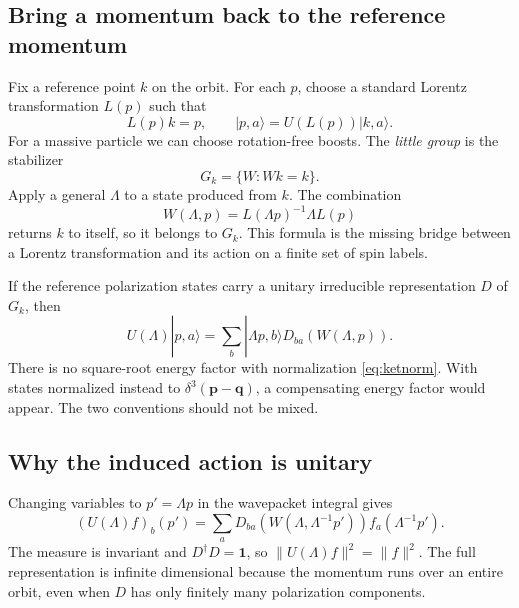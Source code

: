 \documentclass[11pt]{article}
\newcommand{\one}{\mathbf 1}
\begin{document}
\subsection{Bring a momentum back to the reference momentum}
Fix a reference point \(k\) on the orbit. For each \(p\), choose a
standard Lorentz transformation \(L(p)\) such that
\begin{equation}
 L(p)k=p,\qquad |p,a\rangle=U(L(p))|k,a\rangle.
 \label{eq:standardboost}
\end{equation}
For a massive particle we can choose rotation-free boosts. The
\emph{little group} is the stabilizer
\begin{equation}
 G_k=\{W:Wk=k\}.
 \label{eq:littledef}
\end{equation}
Apply a general \(\Lambda\) to a state produced from \(k\). The
combination
\begin{equation}
 \boxed{W(\Lambda,p)=L(\Lambda p)^{-1}\Lambda L(p)}
 \label{eq:wigner}
\end{equation}
returns \(k\) to itself, so it belongs to \(G_k\). This formula is
the missing bridge between a Lorentz transformation and its action
on a finite set of spin labels.

If the reference polarization states carry a unitary irreducible
representation \(D\) of \(G_k\), then
\begin{equation}
 \boxed{U(\Lambda)|p,a\rangle
   =\sum_b|\Lambda p,b\rangle
        D_{ba}\!\left(W(\Lambda,p)\right).}
 \label{eq:ketwigner}
\end{equation}
There is no square-root energy factor with normalization
\eqref{eq:ketnorm}. With states normalized instead to
\(\delta^3(\bm p-\bm q)\), a compensating energy factor would
appear. The two conventions should not be mixed.

\subsection{Why the induced action is unitary}
Changing variables to \(p'=\Lambda p\) in the wavepacket integral
gives
\begin{equation}
 (U(\Lambda)f)_b(p')
    =\sum_a D_{ba}\!\left(W(\Lambda,\Lambda^{-1}p')\right)
                  f_a(\Lambda^{-1}p').
 \label{eq:wffransform}
\end{equation}
The measure is invariant and \(D^\dagger D=\one\), so
\(\|U(\Lambda)f\|^2=\|f\|^2\). The full representation is
infinite dimensional because the momentum runs over an entire orbit,
even when \(D\) has only finitely many polarization components.
\end{document}
